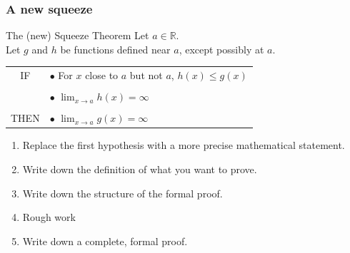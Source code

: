 \documentclass[14pt]{beamer}
\begin{document}
	\begin{frame}[t]
		\frametitle{A new squeeze}
		\fontsize{13}{13}\selectfont
		\begin{block}{The (new) Squeeze Theorem}
			Let $a \in \mathbb{R}$. \\ Let $g$ and $h$ be functions defined near $a$, except
			possibly at $a$.

			\vspace{.2cm}
			\begin{tabular}{cl}
				IF            & $\bullet$ {For $x$ close to $a$ but not $a$,} \; $\displaystyle %
h(x) \leq g(x)$ \\
				\vspace{-.2cm} \\
				              & $\bullet$ $\displaystyle \lim_{x \to a}h(x) = \infty$                                                                                      \\
				\vspace{-.1cm} \\
				THEN          & $\bullet$ $\displaystyle \lim_{x \to a}g(x) = \infty$
			\end{tabular}
		\end{block}

		\begin{enumerate}

			\item Replace the first hypothesis with a more precise mathematical statement.

			\item Write down the definition of what you want to prove.

			\item Write down the structure of the formal proof.

			\item Rough work

			\item Write down a complete, formal proof.
		\end{enumerate}
	\end{frame}
\end{document}
